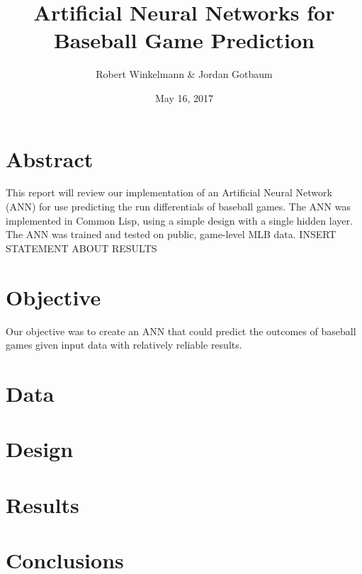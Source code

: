 \documentclass[]{article}   %
\begin{document}
\title{Artificial Neural Networks for Baseball Game Prediction}   %
\author{Robert Winkelmann \& Jordan Gotbaum}         %
\date{May 16, 2017}    %
\maketitle

\section{Abstract}
  This report will review our implementation of an Artificial Neural Network (ANN) for use predicting the run differentials of baseball games. The ANN was implemented in Common Lisp, using a simple design with a single hidden layer. The ANN was trained and tested on public, game-level MLB data. INSERT STATEMENT ABOUT RESULTS

\section{Objective}     %
Our objective was to create an ANN that could predict the outcomes of baseball games given input data with relatively reliable results. 

\section{Data}     %

\section{Design}

\section{Results}  

\section{Conclusions}       %
\end{document}
